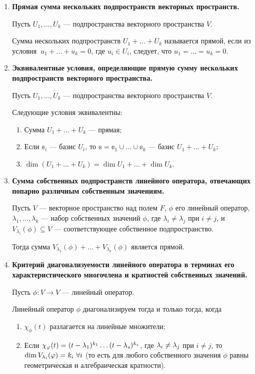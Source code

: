 \begin{enumerate}
\item \textbf{Прямая сумма нескольких подпространств векторных пространств.}

Пусть $U_1, \ldots, U_k$ --- подпространства векторного пространства $V$.

Сумма нескольких подпространств $U_1 + \ldots + U_k$ называется прямой, если из условия $\:u_1 + \ldots + u_k = 0$, где $u_i \in U_i$, следует, что $u_1 = \ldots = u_k = 0$.

\item \textbf{Эквивалентные условия, определяющие прямую сумму нескольких подпространств векторного пространства.}

Пусть $U_1, \ldots, U_k$ --- подпространства векторного пространства $V$.

Следующие условия эквивалентны:
	\begin{enumerate}
		\item Сумма $U_1 + \ldots + U_k$ --- прямая;
		\item Если $\mathbb{e}_i$ --- базис $U_i$, то $\mathbb{e} = \mathbb{e}_1 \cup \ldots \cup \mathbb{e}_k$ --- базис $U_1 + \ldots + U_k;$
		\item $\dim(U_1 + \ldots + U_k) = \dim{U_1} + \ldots + \dim{U_k}.$
	\end{enumerate}
	
\item \textbf{Сумма собственных подпространств линейного оператора, отвечающих попарно различным собственным значениям.}

Пусть $V$ --- векторное пространство над полем $F$, $\phi$ его линейный оператор, $\lambda_1, \ldots, \lambda_k$ --- набор собственных значений $\phi$, где $\lambda_i \neq \lambda_j$ при $i \neq j$, и $V_{\lambda_i}(\phi) \subseteq V$ --- соответствующее собственное подпространство.

Тогда сумма $V_{\lambda_1}(\phi) + \ldots + V_{\lambda_k}(\phi)$ является прямой.

\item \textbf{Критерий диагонализуемости линейного оператора в терминах его характеристического многочлена и кратностей собственных значений.}

Пусть $\phi\colon V \rightarrow V$ --- линейный оператор.

Линейный оператор $\phi$ диагонализируем тогда и только тогда, когда 
\begin{enumerate}
\item $\chi_\phi(t)$ разлагается на линейные множители;
\item Если $\chi_\varphi(t) = (t - \lambda_1)^{k_1}\dots(t - \lambda_s)^{k_s}$, где $\lambda_i \neq \lambda_j$ при $i \neq j$, то $\dim V_{\lambda_i}(\varphi) = k_i \ \forall i$ (то есть для любого собственного значения $\phi$ равны геометрическая и алгебраическая кратности).
\end{enumerate}


\end{enumerate}
